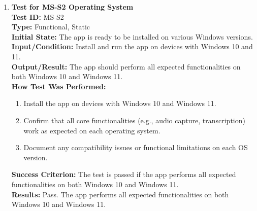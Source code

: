 \documentclass[12pt, titlepage]{article}
\begin{document}
\begin{enumerate}
    \item \textbf{Test for MS-S2 Operating System} \\
      \newline
      \textbf{Test ID:} MS-S2 \\
      \textbf{Type:} Functional, Static \\
      \textbf{Initial State:} The app is ready to be installed on various Windows versions. \\
      \textbf{Input/Condition:} Install and run the app on devices with Windows 10 and 11. \\
      \textbf{Output/Result:} The app should perform all expected functionalities on both Windows 10 and Windows 11. \\
      \textbf{How Test Was Performed:}
      \begin{enumerate}
          \item Install the app on devices with Windows 10 and Windows 11.
          \item Confirm that all core functionalities (e.g., audio capture, transcription) work as expected on each operating system.
          \item Document any compatibility issues or functional limitations on each OS version.
      \end{enumerate}
      \textbf{Success Criterion:} The test is passed if the app performs all expected functionalities on both Windows 10 and Windows 11.\\
      \textbf{Results:} Pass. The app performs all expected functionalities on both Windows 10 and Windows 11.\\


\end{enumerate}
\end{document}

